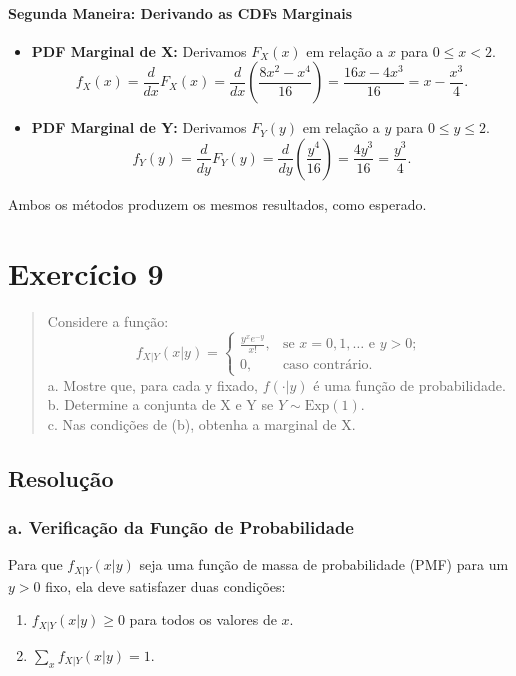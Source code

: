 \documentclass[12pt]{article}
\begin{document}
\paragraph{Segunda Maneira: Derivando as CDFs Marginais}
\begin{itemize}
    \item \textbf{PDF Marginal de X:} Derivamos $F_X(x)$ em relação a $x$ para $0 \le x < 2$.
    \[ f_X(x) = \frac{d}{dx} F_X(x) = \frac{d}{dx} \left( \frac{8x^2-x^4}{16} \right) = \frac{16x - 4x^3}{16} = x - \frac{x^3}{4}. \]
    \item \textbf{PDF Marginal de Y:} Derivamos $F_Y(y)$ em relação a $y$ para $0 \le y \le 2$.
    \[ f_Y(y) = \frac{d}{dy} F_Y(y) = \frac{d}{dy} \left( \frac{y^4}{16} \right) = \frac{4y^3}{16} = \frac{y^3}{4}. \]
\end{itemize}
Ambos os métodos produzem os mesmos resultados, como esperado. \hfill \qedsymbol

\section{Exercício 9}

\begin{quote}
Considere a função:
\[ f_{X|Y}(x|y) = \begin{cases} \frac{y^x e^{-y}}{x!}, & \text{se } x = 0, 1, \dots \text{ e } y > 0; \\ 0, & \text{caso contrário.} \end{cases} \]
a. Mostre que, para cada y fixado, $f(\cdot|y)$ é uma função de probabilidade. \\
b. Determine a conjunta de X e Y se $Y \sim \text{Exp}(1)$. \\
c. Nas condições de (b), obtenha a marginal de X.
\end{quote}

\subsection*{Resolução}

\subsubsection*{a. Verificação da Função de Probabilidade}
Para que $f_{X|Y}(x|y)$ seja uma função de massa de probabilidade (PMF) para um $y>0$ fixo, ela deve satisfazer duas condições:
\begin{enumerate}
    \item $f_{X|Y}(x|y) \ge 0$ para todos os valores de $x$.
    \item $\sum_{x} f_{X|Y}(x|y) = 1$.
\end{enumerate}
\end{document}

